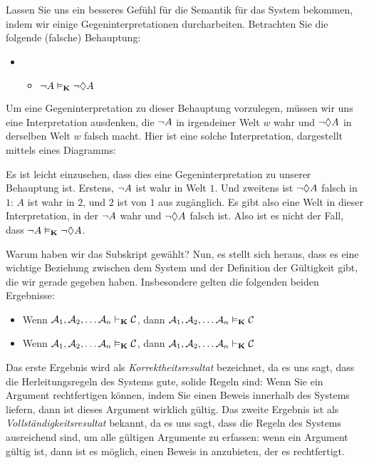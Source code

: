 Lassen Sie uns ein besseres Gefühl für die Semantik für das System \mlK bekommen, indem wir einige Gegeninterpretationen durcharbeiten. Betrachten Sie die folgende (falsche) Behauptung:
\begin{itemize}
	\item[]
	      \begin{itemize}
		      \item[]$\neg A\vDash_{\mathbf{K}} \neg \Diamond A$
	      \end{itemize}
\end{itemize}
Um eine Gegeninterpretation zu dieser Behauptung vorzulegen, müssen wir uns eine Interpretation ausdenken, die $\neg A$ in irgendeiner Welt $w$ wahr und $\neg\Diamond A$ in derselben Welt $w$ falsch macht. Hier ist eine solche Interpretation, dargestellt mittels eines Diagramms:
\begin{center}
\end{center}
Es ist leicht einzusehen, dass dies eine Gegeninterpretation zu unserer Behauptung ist. Erstens, $\neg A$ ist wahr in Welt $1$. Und zweitens ist $\neg\Diamond A$ falsch in $1$: $A$ ist wahr in $2$, und $2$ ist von $1$ aus zugänglich. Es gibt also eine Welt in dieser Interpretation, in der $\neg A$ wahr und $\neg\Diamond A$ falsch ist. Also ist es nicht der Fall, dass $\neg A\vDash_{\mathbf{K}}\neg\Diamond A$.

Warum haben wir das Subskript \mlK gewählt? Nun, es stellt sich heraus, dass es eine wichtige Beziehung zwischen dem System \mlK{} und der Definition der Gültigkeit gibt, die wir gerade gegeben haben. Insbesondere gelten die folgenden beiden Ergebnisse:
\begin{itemize}
	\item Wenn $\mathcal{A}_1,\mathcal{A}_2, \dots \mathcal{A}_n\vdash_{\mathbf{K}}\mathcal{C}$, dann $\mathcal{A}_1,\mathcal{A}_2, \dots \mathcal{A}_n\vDash_{\mathbf{K}}\mathcal{C}$
	\item Wenn $\mathcal{A}_1,\mathcal{A}_2, \dots \mathcal{A}_n\vDash_{\mathbf{K}}\mathcal{C}$, dann $\mathcal{A}_1,\mathcal{A}_2, \dots \mathcal{A}_n\vdash_{\mathbf{K}}\mathcal{C}$
\end{itemize}
Das erste Ergebnis wird als \emph{Korrektheitsresultat} bezeichnet, da es uns sagt, dass die Herleitungsregeln des Systems \mlK{} gute, solide Regeln sind: Wenn Sie ein Argument rechtfertigen können, indem Sie einen Beweis innerhalb des Systems \mlK liefern, dann ist dieses Argument wirklich gültig. Das zweite Ergebnis ist als \emph{Vollständigkeitsresultat} bekannt, da es uns sagt, dass die Regeln des Systems \mlK{} ausreichend sind, um alle gültigen Argumente zu erfassen: wenn ein Argument gültig ist, dann ist es möglich, einen Beweis in \mlK{} anzubieten, der es rechtfertigt.


